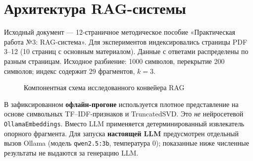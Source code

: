 \documentclass[12pt,a4paper]{article}
\begin{document}
\section{Архитектура RAG-системы}
Исходный документ --- 12-страничное методическое пособие «Практическая работа №3: RAG-система». Для экспериментов индексировались страницы PDF 3--12 (10 страниц с основным материалом). Данные с ответами распределены по разным страницам. Исходное разбиение: 1000 символов, перекрытие 200 символов; индекс содержит 29 фрагментов, $k=3$.

\begin{figure}[H]\centering
{}
\caption{Компонентная схема исследованного конвейера RAG}
\end{figure}

В зафиксированном \textbf{офлайн-прогоне} используется плотное представление на основе символьных TF--IDF-признаков и TruncatedSVD. Это \emph{не} нейросетевой \texttt{OllamaEmbeddings}. Вместо LLM применяется детерминированный извлекатель опорного фрагмента. Для запуска \textbf{настоящей LLM} предусмотрен отдельный вызов Ollama (модель \texttt{qwen2.5:3b}, температура 0); показанные ниже численные результаты не выдаются за генерацию LLM.
\end{document}
